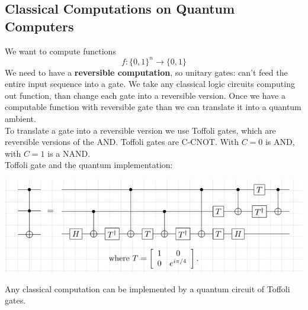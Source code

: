 \documentclass[10pt]{report}
\begin{document}
\subsection{Classical Computations on Quantum Computers}
We want to compute functions $$f:\{0,1\}^n\rightarrow\{0,1\}$$ We need to have a \textbf{reversible computation}, so unitary gates: can't feed the entire input sequence into a gate. We take any classical logic circuits computing out function, than change each gate into a reversible version. Once we have a computable function with reversible gate than we can translate it into a quantum ambient.\\
To translate a gate into a reversible version we use Toffoli gates, which are reversible versions of the AND. Toffoli gates are C-CNOT. With $C= 0$ is AND, with $C=1$ is a NAND.\\
Toffoli gate and the quantum implementation:
\begin{center}
	\includegraphics[scale=0.5]{19.png}
\end{center}
Any classical computation can be implemented by a quantum circuit of Toffoli gates.
\end{document}
